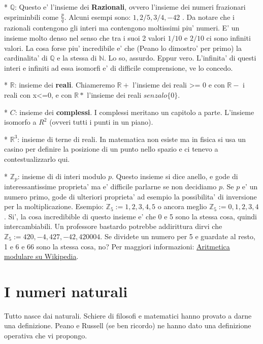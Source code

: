 * $\mathbb{Q}$: Questo e' l'insieme dei \textbf{Razionali}, ovvero l'insieme dei numeri frazionari espriminbili come $\frac{p}{q}$.
Alcuni esempi sono: $1,2/5,3/4,-42$ . Da notare che i razionali contengono gli interi ma contengono moltissimi piu' numeri.
E' un insieme molto denso nel senso
che tra i suoi 2 valori $1/10$ e $2/10$ ci sono infiniti valori. La cosa forse piu' incredibile e' che (Peano lo dimostro' per primo)
la cardinalita' di $\mathbb{Q}$ e la stessa di $\mathbb{N}$. Lo so, assurdo. Eppur vero. L'infinita' di questi interi e infiniti ad essa
isomorfi e' di difficile comprensione, ve lo concedo.

* $\mathbb{R}$: insieme dei \textbf{reali}. Chiameremo $\mathbb{R}+$ l'insieme dei reali >= 0 e con $\mathbb{R}-$ i reali con x<=0, e con $\mathbb{R}*$ l'insieme dei reali $senza lo \{0\}$.

* $C$: insieme dei \textbf{complessi}. I complessi meritano un capitolo a parte. L'insieme \egrave isomorfo a $R^2$ (ovveri tutti i punti in un piano).

* $\mathbb{R}^3$: insieme di terne di reali. In matematica non esiste ma in fisica si usa un casino per definire la posizione di un punto nello spazio
e ci tenevo a contestualizzarlo qui.

* $\mathbb{Z}_p$: insieme di di interi modulo $p$. Questo insieme si dice anello, e gode di interessantissime proprieta' ma e' difficile parlarne se non decidiamo $p$. 
  Se $p$ e' un numero primo, gode di ulteriori proprieta' ad esempio la possibilita' di inversione per la moltiplicazione. Esempio: $\mathbb{Z}_5 := {1,2,3,4,5}$ o ancora
  meglio $\mathbb{Z}_5 := {0, 1,2,3,4}$. Si', la cosa incredibible di questo insieme e' che 0 e 5 sono la stessa cosa, quindi intercambiabili. Un professore bastardo
  potrebbe addirittura dirvi che $\mathbb{Z}_5 := {420, -4, 427, -42, 420004}$. Se dividete un numero per 5 e guardate al resto, 1 e 6 e 66 sono la stessa cosa, no? 
  Per maggiori informazioni: \href{https://it.wikipedia.org/wiki/Aritmetica_modulare}{Aritmetica modulare su Wikipedia}.

\section{I numeri naturali}

Tutto nasce dai naturali. Schiere di filosofi e matematici hanno provato a darne una definizione. Peano e Russell (se ben ricordo) ne hanno dato una definizione operativa che vi propongo.

